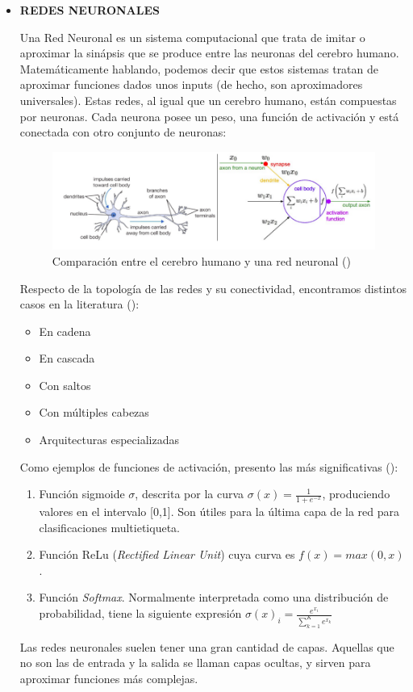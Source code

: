 \begin{itemize}
	\item \textbf{REDES NEURONALES}
	
	Una Red Neuronal es un sistema computacional que trata de imitar o aproximar la sinápsis que se produce entre las neuronas del cerebro humano. Matemáticamente hablando, podemos decir que estos sistemas tratan de aproximar funciones dados unos inputs (de hecho, son aproximadores universales). Estas redes, al igual que un cerebro humano, están compuestas por neuronas. Cada neurona posee un peso, una función de activación y está conectada con otro conjunto de neuronas:
	
	\begin{figure}[H] %
		\centering
		\includegraphics[scale=0.48]{nn1.png}  %
		\caption{Comparación entre el cerebro humano y una red neuronal (\cite{miriam})} 
		\label{fig:nn1}
	\end{figure}
	
	Respecto de la topología de las redes y su conectividad, encontramos distintos casos en la literatura (\cite{berzal}):
	
	\begin{itemize}
		\item En cadena
		\item En cascada
		\item Con saltos
		\item Con múltiples cabezas
		\item Arquitecturas especializadas
	\end{itemize}
	
	Como ejemplos de funciones de activación, presento las más significativas (\cite{miriam}):
	
	\begin{enumerate}
		\item Función sigmoide $\sigma$, descrita por la curva $\sigma(x) = \frac{1}{1+e^{-x}}$, produciendo valores en el intervalo [0,1]. Son útiles para la última capa de la red para clasificaciones multietiqueta.
		\item Función ReLu (\textit{Rectified Linear Unit}) cuya curva es $f(x) = max(0,x)$.
		\item Función \textit{Softmax}.  Normalmente interpretada como una distribución de probabilidad, tiene la siguiente expresión $\sigma(x)_i = \frac{e^{x_i}}{\sum_{k=1}^{K} e^{x_k}}$
			\end{enumerate}
		Las redes neuronales suelen tener una gran cantidad de capas. Aquellas que no son las de entrada y la salida se llaman capas ocultas, y sirven para aproximar funciones más complejas. 
		

\end{itemize}
